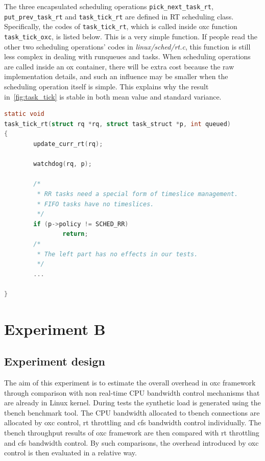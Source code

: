 The three encapsulated scheduling operations \texttt{pick\_next\_task\_rt}, 
\\\texttt{put\_prev\_task\_rt} and \texttt{task\_tick\_rt} are defined in
RT scheduling class. Specifically, the codes of \texttt{task\_tick\_rt},
which is called inside oxc function \texttt{task\_tick\_oxc}, is listed 
below. This is a very simple function. If people read the other two
scheduling operations' codes in \emph{linux/sched/rt.c}, this function is 
still less complex in dealing with runqueues and tasks. When scheduling 
operations are called inside an ox container, there will be extra cost 
because the raw implementation details, and such an influence may 
be smaller when the scheduling operation itself is simple. This explains 
why the result in~\ref{fig:task_tick} is stable in both mean value and 
standard variance.

\begin{lstlisting}[language=C,
			caption={The simple body of \texttt{task\_tick\_rt}},
			label={lst:task_tick_rt}]
static void 
task_tick_rt(struct rq *rq, struct task_struct *p, int queued)
{
        update_curr_rt(rq);

        watchdog(rq, p);

        /*
         * RR tasks need a special form of timeslice management.
         * FIFO tasks have no timeslices.
         */
        if (p->policy != SCHED_RR)
                return;
        /*
         * The left part has no effects in our tests.
         */
        ...

}
\end{lstlisting}

\section{Experiment B}

\subsection{Experiment design}

The aim of this experiment is to estimate the overall overhead in oxc 
framework through comparison with non real-time CPU bandwidth control 
mechanisms that are already in Linux kernel. During tests the synthetic 
load is generated using the tbench benchmark tool. The CPU bandwidth 
allocated to tbench connections are allocated by oxc control, rt 
throttling and cfs bandwidth control individually. The tbench throughput 
results of oxc framework are then compared with rt throttling and cfs 
bandwidth control. By such comparisons, the overhead introduced by oxc 
control is then evaluated in a relative way.

